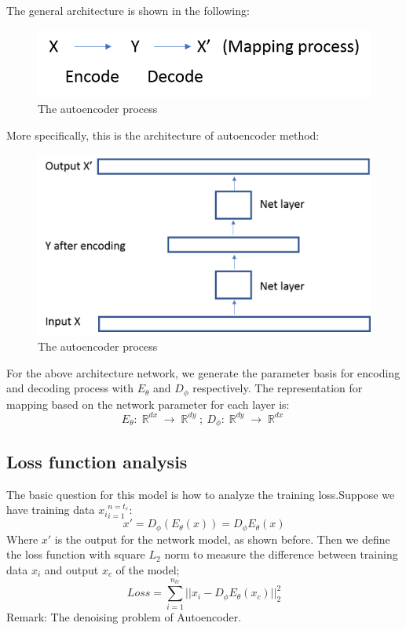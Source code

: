 \documentclass{article}
\DeclareMathOperator{\R}{\mathbb{R}}
\begin{document}
\noindent
The general architecture is shown in the following:
\begin{figure}[H]
\centering
\includegraphics[scale=0.5]{AE_process.png}
\caption{The autoencoder process}
\label{fig:univerise}
\end{figure}

More specifically, this is the architecture of autoencoder method:
\begin{figure}[H]
\centering
\includegraphics[scale=0.3]{AE_arc.png}
\caption{The autoencoder process}
\label{fig:univerise}
\end{figure}
\noindent
For the above architecture network, we generate the parameter basis for encoding and decoding process with $E_{\theta}$ and $D_{\phi}$ respectively. The representation for mapping based on the network parameter for each layer is:
\[
E_{\theta}:\R^{dx}{\rightarrow}\R^{dy};~D_{\phi}:\R^{dy}{\rightarrow}\R^{dx}
\]
\subsection{Loss function analysis}
The basic question for this model is how to analyze the training loss.Suppose we have training data ${x_i}_{i=1}^{n=t_r}$:
\[
x' =D_{\phi}(E_{\theta}(x)) = D_{\phi}E_{\theta}(x)
\]
Where $x'$ is the output for the network model, as shown before. Then we define the loss function with square $L_2$ norm to measure the difference between training data $x_i$ and output $x_c$ of the model;
\[
Loss = \sum_{i=1}^{n_{tr}}||x_i - D_{\phi}E_{\theta}(x_c)||_2^2
\] 
Remark: The denoising problem of Autoencoder. 
\end{document}
